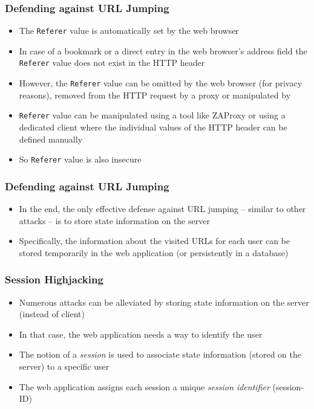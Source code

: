 \begin{frame}
    \frametitle{Defending against URL Jumping}
    \begin{itemize}
        \item The \texttt{Referer} value is automatically set by the web browser
        \item In case of a bookmark or a direct entry in the web browser's address field the \texttt{Referer} value does not exist in the HTTP header
        \item However, the \texttt{Referer} value can be omitted by the web browser (for privacy reasons), removed from the HTTP request by a proxy or manipulated by \attacker
        \item \texttt{Referer} value can be manipulated using a tool like ZAProxy or using a dedicated client where the individual values of the HTTP header can be defined manually
        \item So \texttt{Referer} value is also insecure
    \end{itemize}
\end{frame}

\begin{frame}
    \frametitle{Defending against URL Jumping}
    \begin{itemize}
        \item In the end, the only effective defense against URL jumping -- similar to other attacks -- is to store state information on the server
        \item Specifically, the information about the visited URLs for each user can be stored temporarily in the web application (or persistently in a database)
    \end{itemize}
\end{frame}




\begin{frame}
    \frametitle{Session Highjacking}
    \begin{itemize}
        \item Numerous attacks can be alleviated by storing state information on the server (instead of client)
        \item In that case, the web application needs a way to identify the user
        \item The notion of a \emph{session} is used to associate state information (stored on the server) to a specific user
        \item The web application assigns each session a unique \emph{session identifier} (session-ID)
    \end{itemize}
\end{frame}

